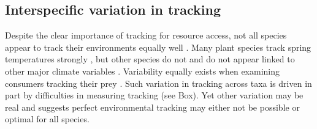 \documentclass[11pt,letterpaper]{article}
\begin{document}
\subsection{Interspecific variation in tracking}
Despite the clear importance of tracking for resource access, not all species appear to track their environments equally well \citep{thackeray2016}. Many plant species track spring temperatures strongly \citep[multiple meta-analysis now show plants's spring phenology on average track spring or annual temperatures 4-6 days/$\degree$C][and simple temperature models can often explain over 90\% of interannual variation in phenology]{Richardson:2006qh,Wolkovich:2012n,thackeray2016}, but other species do not \citep{Cook:2012pnas} and do not appear linked to other major climate variables \citep{thackeray2016}. Variability equally exists when examining consumers tracking their prey \citep[across diverse species tracking over time is 6.1 days/decade but ranges from zero to 15 days/decade, see][]{kharouba2018}. Such variation in tracking across taxa is driven in part by difficulties in measuring tracking (see Box). Yet other variation may be real and suggests perfect environmental tracking may either not be possible or optimal for all species. 
\end{document}
